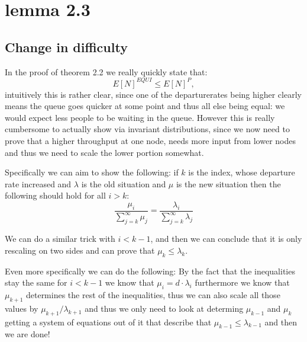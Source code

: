 \chapter{lemma 2.3}\label{ch_lemma2_3}

\section{Change in difficulty}
In the proof of theorem 2.2 we really quickly state that:
$$E[N]^{EQUI} \leq E[N]^P,$$
intuitively this is rather clear, since one of the departurerates being higher clearly means the
queue goes quicker at some point and thus all else being equal: we would expect less people to be waiting
in the queue. However this is really cumbersome to actually show via invariant distributions,
since we now need to prove that a higher throughput at one node, needs more input from lower nodes
and thus we need to scale the lower portion somewhat.

Specifically we can aim to show the following:
if $k$ is the index, whose departure rate increased and $\lambda$ is the old situation and $\mu$
is the new situation then the following should hold for all $i > k$:
$$\frac{\mu_i}{\sum_{j=k}^\infty \mu_j} = \frac{\lambda_i}{\sum_{j=k}^\infty \lambda_j}$$

We can do a similar trick with $i < k - 1$, and then we can conclude that it is only rescaling on two
sides and can prove that $\mu_k \leq \lambda_k$.

Even more specifically we can do the following:
By the fact that the inequalities stay the same for $i < k - 1$ we know that $\mu_i = d\cdot \lambda_i$
furthermore we know that $\mu_{k+1}$ determines the rest of the inequalities, thus we can also scale all
those values by $\mu_{k+1}/\lambda_{k+1}$ and thus we only need to look at determing $\mu_{k-1}$ and $\mu_{k}$
getting a system of equations out of it that describe that $\mu_{k-1} \leq \lambda_{k-1}$ and then we are done!
